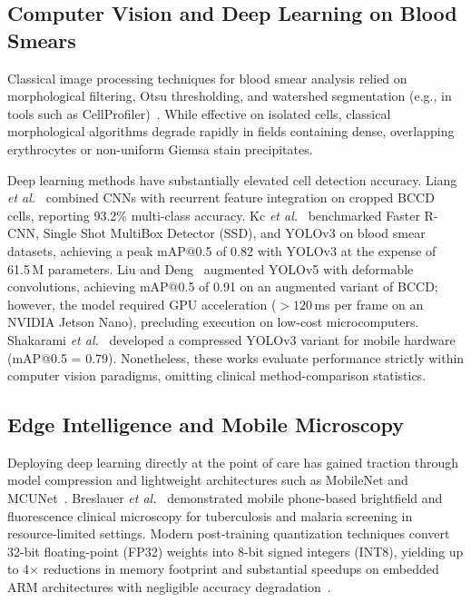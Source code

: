 \documentclass[10pt,conference]{IEEEtran}
\begin{document}
\subsection{Computer Vision and Deep Learning on Blood Smears}
Classical image processing techniques for blood smear analysis relied on morphological filtering, Otsu thresholding, and watershed segmentation (e.g., in tools such as CellProfiler)~\cite{carpenter2006}. While effective on isolated cells, classical morphological algorithms degrade rapidly in fields containing dense, overlapping erythrocytes or non-uniform Giemsa stain precipitates.

Deep learning methods have substantially elevated cell detection accuracy. Liang \emph{et al.}~\cite{liang2018} combined CNNs with recurrent feature integration on cropped BCCD cells, reporting 93.2\% multi-class accuracy. Kc \emph{et al.}~\cite{kc2021} benchmarked Faster R-CNN, Single Shot MultiBox Detector (SSD), and YOLOv3 on blood smear datasets, achieving a peak mAP@0.5 of 0.82 with YOLOv3 at the expense of 61.5\,M parameters. Liu and Deng~\cite{liu2022} augmented YOLOv5 with deformable convolutions, achieving mAP@0.5 of 0.91 on an augmented variant of BCCD; however, the model required GPU acceleration ($>120$\,ms per frame on an NVIDIA Jetson Nano), precluding execution on low-cost microcomputers. Shakarami \emph{et al.}~\cite{shakarami2021} developed a compressed YOLOv3 variant for mobile hardware (mAP@0.5 = 0.79). Nonetheless, these works evaluate performance strictly within computer vision paradigms, omitting clinical method-comparison statistics.

\subsection{Edge Intelligence and Mobile Microscopy}
Deploying deep learning directly at the point of care has gained traction through model compression and lightweight architectures such as MobileNet and MCUNet~\cite{lin2020, jacob2018}. Breslauer \emph{et al.}~\cite{breslauer2009} demonstrated mobile phone-based brightfield and fluorescence clinical microscopy for tuberculosis and malaria screening in resource-limited settings. Modern post-training quantization techniques convert 32-bit floating-point (FP32) weights into 8-bit signed integers (INT8), yielding up to 4$\times$ reductions in memory footprint and substantial speedups on embedded ARM architectures with negligible accuracy degradation~\cite{jacob2018}.

\end{document}

